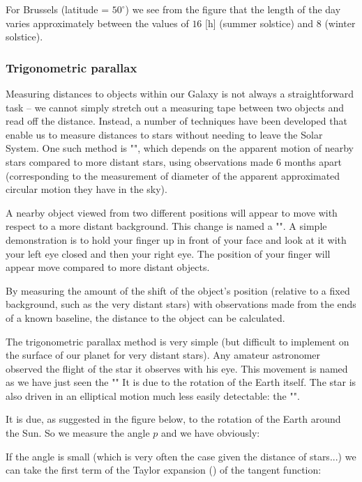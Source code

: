	For Brussels (latitude = $50^\circ$) we see from the figure that the length of the day varies approximately between the values of $16$ [h] (summer solstice) and $8$ (winter solstice).
	
	\subsubsection{Trigonometric parallax}
	Measuring distances to objects within our Galaxy is not always a straightforward task – we cannot simply stretch out a measuring tape between two objects and read off the distance. Instead, a number of techniques have been developed that enable us to measure distances to stars without needing to leave the Solar System. One such method is "", which depends on the apparent motion of nearby stars compared to more distant stars, using observations made $6$ months apart (corresponding to the measurement of diameter of the apparent approximated circular motion they have in the sky).

	A nearby object viewed from two different positions will appear to move with respect to a more distant background. This change is named a "". A simple demonstration is to hold your finger up in front of your face and look at it with your left eye closed and then your right eye. The position of your finger will appear move compared to more distant objects.

	By measuring the amount of the shift of the object's position (relative to a fixed background, such as the very distant stars) with observations made from the ends of a known baseline, the distance to the object can be calculated.
	
	The trigonometric parallax method is very simple (but difficult to implement on the surface of our planet for very distant stars). Any amateur astronomer observed the flight of the star it observes with his eye. This movement is named as we have just seen the "" It is due to the rotation of the Earth itself. The star is also driven in an elliptical motion much less easily detectable: the "".

	It is due, as suggested in the figure below, to the rotation of the Earth around the Sun. So we measure the angle $p$ and we have obviously:
	
	If the angle is small (which is very often the case given the distance of stars...) we can take the first term of the Taylor expansion () of the tangent function:
	
